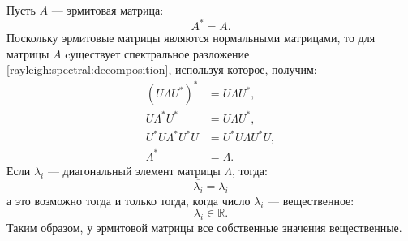 Пусть $A$ --- эрмитовая матрица:
\[
    A^* = A.
\]
Поскольку эрмитовые матрицы являются нормальными матрицами, то для матрицы $A$ cуществует спектральное разложение
\eqref{rayleigh:spectral:decomposition}, используя которое, получим:
\begin{align*}
    \left ( U \Lambda U^* \right )^* & = U \Lambda U^* , \\
    U \Lambda^* U^* & = U \Lambda U^* , \\
    U^* U \Lambda^* U^* U & = U^* U \Lambda U^* U, \\
    \Lambda^* & = \Lambda .
\end{align*}
Если $\lambda_i$ --- диагональный элемент матрицы $\Lambda$, тогда:
\[
    \overline{\lambda_i} = \lambda_i
\]
а это возможно тогда и только тогда, когда число $\lambda_i$ --- вещественное:
\[
    \lambda_i \in \mathbb{R}.
\]
Таким образом, у эрмитовой матрицы все собственные значения вещественные.

